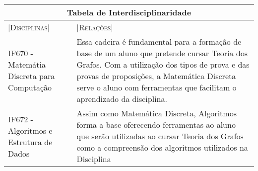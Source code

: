 \documentclass[10pt]{article}
\begin{document}
\begin{tabular}{ |p{7cm}||p{7cm}|}
\hline
\multicolumn{2}{|c|}{\Large{\textbf{Tabela de Interdisciplinaridade}}} \\
\hline
|\large{\textsc{Disciplinas}}|& |\large{\textsc{Relações}}|\\[0.1ex]
\hline

IF670 - Matemátia Discreta para Computação & Essa cadeira é fundamental para a formação de base de um aluno que pretende cursar Teoria dos Grafos. Com a utilização dos tipos de prova e das provas de proposições, a Matemática Discreta serve o aluno com ferramentas que facilitam o aprendizado da disciplina.\\
\hline
IF672 - Algoritmos e Estrutura de Dados & Assim como Matemática Discreta, Algoritmos forma a base oferecendo ferramentas ao aluno que serão utilizadas ao cursar Teoria dos Grafos como a compreensão dos algoritmos utilizados na Disciplina\\
\hline 
\end{tabular}\\



\end{document}
